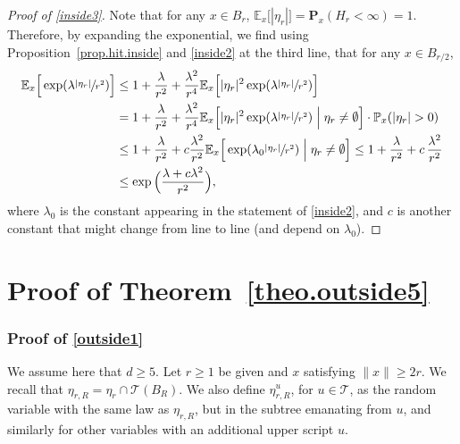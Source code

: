 \documentclass[11pt]{article}
\numberwithin{equation}{section}
\theoremstyle{plain}
\theoremstyle{definition}
\newcommand{\1}{{\text{\Large $\mathfrak 1$}}}
\begin{document}
\begin{proof}[Proof of \eqref{inside3}]
Note that for any $x\in B_r$, $\mathbb E_x\big[|\eta_r|\big] =
\mathbf P_x(H_r<\infty) = 1$.
Therefore, by expanding the exponential,
we find using Proposition~\ref{prop.hit.inside} and \eqref{inside2} at the third line, that for any $x\in B_{r/2}$,
\begin{align*}
\mathbb E_x\Big[\exp(\lambda
\sfrac{|\eta_r|}{r^2})\Big] & \le 1 + \frac{\lambda}{r^2} + \frac{\lambda^2}{r^4} \mathbb E_x\Big[|\eta_r|^2\exp(\lambda \sfrac{|\eta_r|}{r^2})\Big]\\
& = 1 + \frac{\lambda}{r^2} + \frac{\lambda^2}{r^4} \mathbb E_x\Big[|\eta_r|^2 \exp(\lambda \sfrac{|\eta_r|}{r^2})\Bigm|\eta_r \neq \emptyset \Big]\cdot \mathbb P_x(|\eta_r|>0) \\
&\le 1+ \frac{\lambda}{r^2} + c\frac{\lambda^2}{r^2} \mathbb E_x\Big[ \exp(\lambda_0 \sfrac{|\eta_r|}{r^2})\Bigm|\eta_r\neq \emptyset \Big] \le 1+ \frac{\lambda}{r^2} + c\,\frac{\lambda^2}{r^2}\\
& \le \exp\Big(\frac{\lambda + c\lambda^2}{r^2}\Big),
\end{align*}
where $\lambda_0$ is the constant appearing in the statement of \eqref{inside2}, and $c$ is another constant that might change from line to line (and depend on $\lambda_0$).
\end{proof}

\section{Proof of Theorem~\ref{theo.outside5}}\label{sec-outside5}
\subsubsection*{Proof of \eqref{outside1}}
We assume here that $d\ge 5$. Let $r\ge 1$ be given and $x$ satisfying $\|x\|\ge 2r$.
We recall that $\eta_{r,R}=\eta_r\cap \mathcal T(B_R)$. We also define $\eta_{r,R}^u$, for $u\in \mathcal T$, as the random variable with the
same law as $\eta_{r,R}$, but in the subtree emanating from $u$, and similarly for other variables with an additional upper script $u$.
\end{document}
